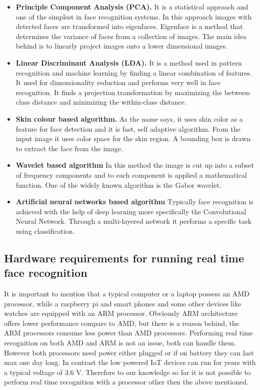 \begin{itemize}
    \item \textbf{Principle Component Analysis (PCA).} It is a statistical approach and one of the simplest in face recognition systems. In this approach images with detected faces are transformed into eigenfaces. Eigenface is a method that determines the variance of faces from a collection of images. The main idea behind is to linearly project images onto a lower dimensional images. 
    
    
    \item \textbf{Linear Discriminant Analysis (LDA).}
   It is a method used in pattern recognition and machine learning by finding a linear combination of features. It used for dimensionality reduction and performs very well in face recognition. It finds a projection transformation by maximizing the between-class distance and minimizing the within-class distance. 
   
   
   
    \item \textbf{Skin colour based algorithm.}
    As the name says, it uses skin color as a feature for face detection and it is fast, self adaptive algorithm. From the input image it uses color space for the skin region. A bounding box is drawn to extract the face from the image.
    
    
    \item \textbf{Wavelet based algorithm}
    In this method the image is cut up into a subset of frequency components and to each component is applied a mathematical function. One of the widely known algorithm is the Gabor wavelet.
    \item \textbf{Artificial  neural  networks  based  algorithm}
    Typically face recognition is achieved with the help of deep learning more specifically the Convolutional Neural Network. Through a multi-layered network it performs a specific task using classification.
\end{itemize}


\subsection{Hardware requirements for running real time face recognition}

It is important to mention that a typical computer or a laptop possess an AMD processor, while a raspberry pi and smart phones and some other devices like watches are equipped with an ARM processor. Obviously ARM architecture offers lower performance compare to AMD, but there is a reason behind, the ARM processors consume less power than AMD processors. Performing real time recognition on both AMD and ARM is not an issue, both can handle them. However both processors need power either plugged or if on battery they can last max one day long. In contrast the low powered IoT devices can run for years with a typical voltage of 3.6 V. Therefore to our knowledge so far it is not possible to perform real time recognition with a processor other then the above mentioned. 

